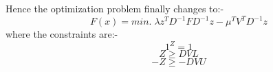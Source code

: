 \documentclass[twoside,11pt]{article}
\begin{document}
Hence the optimization problem finally changes to:-
\begin{equation}
  F(x) = min.\; \lambda z^TD^{-1}FD^{-1}z - \mu^TV^TD^{-1}z
\end{equation}
where the constraints are:-
\begin{equation}
  1^Z = 1
\end{equation}
\begin{equation}
  Z \geqslant DVL
\end{equation}
\begin{equation}
  -Z \geqslant -DVU
\end{equation}
\end{document}
